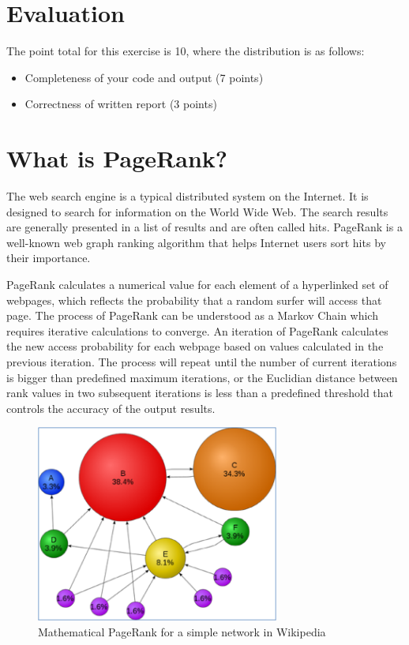 \section*{Evaluation}
The point total for this exercise is 10, where the distribution is as follows:
\begin{itemize}
\item Completeness of your code and output (7 points)
\item Correctness of written report (3 points)
\end{itemize}

\section{What is PageRank?}
The web search engine is a typical distributed system on the Internet. It is
designed to search for information on the World Wide Web. The search results
are generally presented in a list of results and are often called hits.
PageRank is a well-known web graph ranking algorithm that helps Internet users
sort hits by their importance. 

PageRank calculates a numerical value for each element of a hyperlinked set of
webpages, which reflects the probability that a random surfer will access that
page. The process of PageRank can be understood as a Markov Chain which
requires iterative calculations to converge. An iteration of PageRank
calculates the new access probability for each webpage based on values
calculated in the previous iteration. The process will repeat until the number
of current iterations is bigger than predefined maximum iterations, or the
Euclidian distance between rank values in two subsequent iterations is less
than a predefined threshold that controls the accuracy of the output results. 

\begin{figure}[!htbp]
\centering
\includegraphics[width=8cm]{section/icloud/assignment/problems/project2/pagerankexample}
\caption{Mathematical PageRank for a simple network in Wikipedia}
\label{fig:pagerankexample}
\end{figure}

